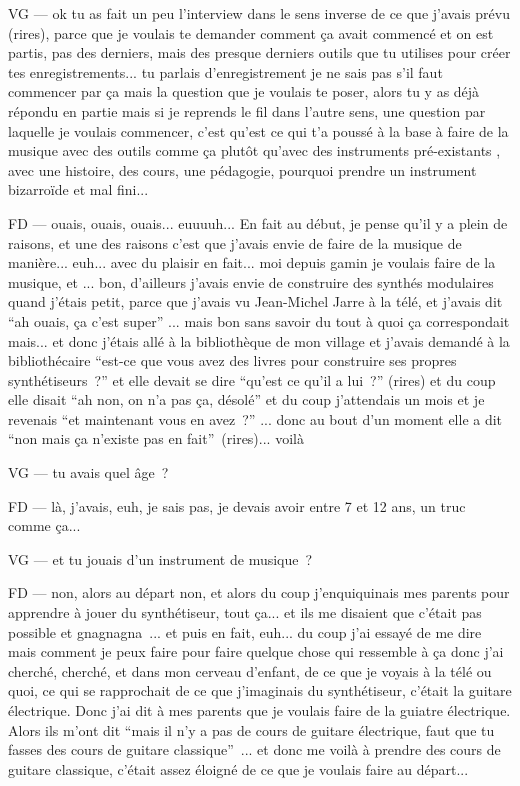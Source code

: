 VG — ok tu as fait un peu l'interview dans le sens inverse de ce que j'avais prévu (rires), parce que je voulais te demander comment ça avait commencé et on est partis, pas des derniers, mais des presque derniers outils que tu utilises pour créer tes enregistrements... tu parlais d'enregistrement je ne sais pas s'il faut commencer par ça mais la question que je voulais te poser, alors tu y as déjà répondu en partie mais si je reprends le fil dans l'autre sens, une question par laquelle je voulais commencer, c'est qu'est ce qui t'a poussé à la base à faire de la musique avec des outils comme ça plutôt qu'avec des instruments pré-existants , avec une histoire, des cours, une pédagogie, pourquoi prendre un instrument bizarroïde et mal fini... 

FD — ouais, ouais, ouais... euuuuh... En fait au début, je pense qu'il y a plein de raisons, et une des raisons c'est que j'avais envie de faire de la musique de manière... euh... avec du plaisir en fait... moi depuis gamin je voulais faire de la musique, et ... bon, d'ailleurs j'avais envie de construire des synthés modulaires quand j'étais petit, parce que j'avais vu Jean-Michel Jarre à la télé, et j'avais dit ``ah ouais, ça c'est super'' ... mais bon sans savoir du tout à quoi ça correspondait mais... et donc j'étais allé à la bibliothèque de mon village et j'avais demandé à la bibliothécaire ``est-ce que vous avez des livres pour construire ses propres synthétiseurs ?'' et elle devait se dire ``qu'est ce qu'il a lui ?'' (rires) et du coup elle disait ``ah non, on n'a pas ça, désolé'' et du coup j'attendais un mois et je revenais ``et maintenant vous en avez ?'' ... donc au bout d'un moment elle a dit ``non mais ça n'existe pas en fait'' (rires)... voilà 

VG — tu avais quel âge ? 

FD — là, j'avais, euh, je sais pas, je devais avoir entre 7 et 12 ans, un truc comme ça... 

VG — et tu jouais d'un instrument de musique ? 

FD — non, alors au départ non, et alors du coup j'enquiquinais mes parents pour apprendre à jouer du synthétiseur, tout ça... et ils me disaient que c'était pas possible et gnagnagna ... et puis en fait, euh... du coup j'ai essayé de me dire mais comment je peux faire pour faire quelque chose qui ressemble à ça donc j'ai cherché, cherché, et dans mon cerveau d'enfant, de ce que je voyais à la télé ou quoi, ce qui se rapprochait de ce que j'imaginais du synthétiseur, c'était la guitare électrique. Donc j'ai dit à mes parents que je voulais faire de la guiatre électrique. Alors ils m'ont dit ``mais il n'y a pas de cours de guitare électrique, faut que tu fasses des cours de guitare classique'' ... et donc me voilà à prendre des cours de guitare classique, c'était assez éloigné de ce que je voulais faire au départ... 

